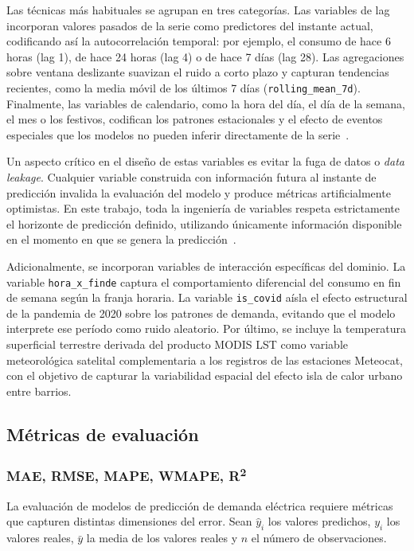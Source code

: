 \documentclass[12pt, a4paper]{article}
\begin{document}
Las técnicas más habituales se agrupan en tres categorías. Las variables de lag incorporan valores pasados de la serie como predictores del instante actual, codificando así la autocorrelación temporal: por ejemplo, el consumo de hace 6 horas (lag 1), de hace 24 horas (lag 4) o de hace 7 días (lag 28). Las agregaciones sobre ventana deslizante suavizan el ruido a corto plazo y capturan tendencias recientes, como la media móvil de los últimos 7 días (\texttt{rolling\_mean\_7d}). Finalmente, las variables de calendario, como la hora del día, el día de la semana, el mes o los festivos, codifican los patrones estacionales y el efecto de eventos especiales que los modelos no pueden inferir directamente de la serie~\cite{rubattu2023}.

Un aspecto crítico en el diseño de estas variables es evitar la fuga de datos o \textit{data leakage}. Cualquier variable construida con información futura al instante de predicción invalida la evaluación del modelo y produce métricas artificialmente optimistas. En este trabajo, toda la ingeniería de variables respeta estrictamente el horizonte de predicción definido, utilizando únicamente información disponible en el momento en que se genera la predicción~\cite{rubattu2023}.

Adicionalmente, se incorporan variables de interacción específicas del dominio. La variable \texttt{hora\_x\_finde} captura el comportamiento diferencial del consumo en fin de semana según la franja horaria. La variable \texttt{is\_covid} aísla el efecto estructural de la pandemia de 2020 sobre los patrones de demanda, evitando que el modelo interprete ese período como ruido aleatorio. Por último, se incluye la temperatura superficial terrestre derivada del producto MODIS LST como variable meteorológica satelital complementaria a los registros de las estaciones Meteocat, con el objetivo de capturar la variabilidad espacial del efecto isla de calor urbano entre barrios.

\subsection{Métricas de evaluación}

\subsubsection{MAE, RMSE, MAPE, WMAPE, R\textsuperscript{2}}

La evaluación de modelos de predicción de demanda eléctrica requiere métricas que capturen distintas dimensiones del error. Sean $\hat{y}_i$ los valores predichos, $y_i$ los valores reales, $\bar{y}$ la media de los valores reales y $n$ el número de observaciones.
\end{document}
